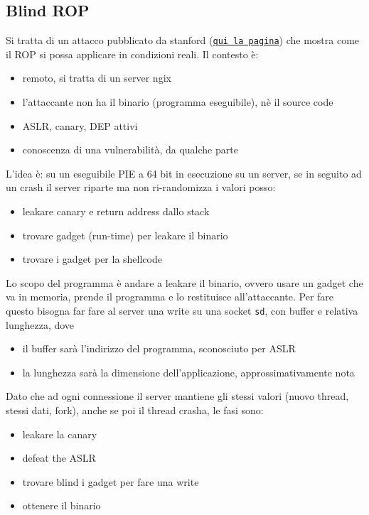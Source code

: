 \newpage

\subsection{Blind ROP}

Si tratta di un attacco pubblicato da stanford (\href{http://www.scs.stanford.edu/brop/}{\texttt{qui la pagina}}) che mostra come il ROP si possa applicare in condizioni reali. Il contesto è: 
\begin{itemize}
	\item remoto, si tratta di un server ngix
	\item l'attaccante non ha il binario (programma eseguibile), nè il source code
	\item ASLR, canary, DEP attivi
	\item conoscenza di una vulnerabilità, da qualche parte
\end{itemize}

L'idea è: su un eseguibile PIE a 64 bit in esecuzione su un server, se in seguito ad un crash il server riparte ma non ri-randomizza i valori posso: 
\begin{itemize}
	\item leakare canary e return address dallo stack
	\item trovare gadget (run-time) per leakare il binario
	\item trovare i gadget per la shellcode
\end{itemize}

Lo scopo del programma è andare a leakare il binario, ovvero usare un gadget che va in memoria, prende il programma e lo restituisce all'attaccante.  Per fare questo bisogna far fare al server una write su una socket \texttt{sd}, con buffer e relativa lunghezza, dove 
\begin{itemize}
	\item il buffer sarà l'indirizzo del programma, sconosciuto per ASLR
	\item la lunghezza sarà la dimensione dell'applicazione, approssimativamente nota
\end{itemize}

Dato che ad ogni connessione il server mantiene gli stessi valori (nuovo thread, stessi dati, fork), anche se poi il thread crasha, le fasi sono: 
\begin{itemize}
	\item leakare la canary
	\item defeat the ASLR
	\item trovare blind i gadget per fare una write
	\item ottenere il binario
\end{itemize}

